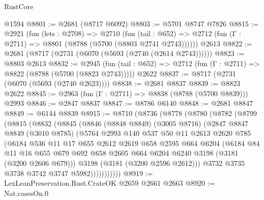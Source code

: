 \begin{lexlean}{RustCore}
\begin{coremodule}
    @1594
@8801 := @2681 (@8717 @6092)
@8803 := @5701 @8747 @7826
@8815 := @2921
    (fun (lets : @2708) =>
    @2710
      (fun (tail : @652) => @2712 (fun (Γ : @2711) => @8801 (@8788 (@5700 (@8803 @2741 @2743))))))
    @2613
@8822 := @2681 (@8717 (@2731 (@6070 (@5693 (@2740 (@2614 @2743))))))
@8823 := @8803 @2613
@8832 := @2945
    (fun (tail : @652) => @2712 (fun (Γ : @2711) => @8822 (@8788 (@5700 (@8823 @2743)))))
    @2622
@8837 := @8717 (@2731 (@6070 (@5693 (@2740 @2623))))
@8838 := @2681 @8837
@8839 := @8823 @2622
@8845 := @2963 (fun (Γ : @2711) => @8838 (@8788 (@5700 @8839))) @2993
@8846 := @2847 @8837
@8847 := @8786 @6140
@8848 := @2681 @8847
@8849 := @6144 @8839
@8915 := @8710
    (@8736
      (@8778
        (@8780
          (@8782
            (@8799
              (@8815
                (@8832
                  (@8845
                    (@8846
                      (@8848 @8849)
                      (@3005 @8716)
                      (@2847
                        @8847
                        @8849
                        (@3010 @8785)
                        (@5764
                          @2993
                          @140
                          @537
                          @50
                          @11
                          @2613
                          @2620
                          @785
                          (@6184
                            @536
                            @11
                            @17
                            @655
                            @2612
                            @2619
                            @658
                            @2595
                            @664
                            @6204
                            (@6184
                              @84
                              @11
                              @16
                              @655
                              @679
                              @692
                              @658
                              @2605
                              @664
                              @6204
                              @6240
                              @3198
                              (@3181 (@3200 @2606 @679)))
                            @3198
                            (@3181 (@3200 @2596 @2612)))
                          @3732
                          @3735
                          @3738
                          @3742
                          @3747
                          @5982)))))))))))
@8919 := LexLeanPreservation.Rust.CrateOK @2659 @2661 @2663
@8920 := Nat.casesOn.{0}

\end{coremodule}
\end{lexlean}
